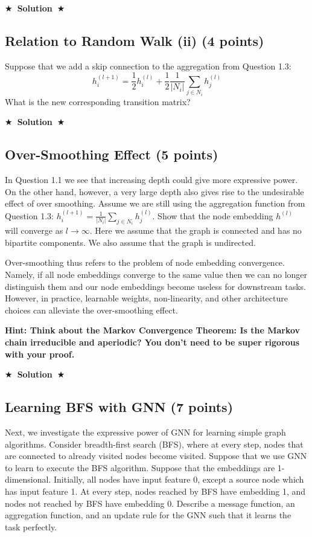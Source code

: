 \documentclass{article}
\numberwithin{figure}{section}
\newcommand{\Solution}[1]{{\medskip \color{red} \bf $\bigstar$~\sf \textbf{Solution}~$\bigstar$ \sf #1 } \bigskip}
\begin{document}
\Solution{}


\subsection{Relation to Random Walk (ii) (4 points)}

Suppose that we add a skip connection to the aggregation from Question 1.3:
$$h^{(l+1)}_i = \frac{1}{2}h^{(l)}_i + \frac{1}{2}\frac{1}{|N_i|} \sum_{j \in N_i} h^{(l)}_j$$
What is the new corresponding transition matrix?

\Solution{}


\subsection{Over-Smoothing Effect (5 points)}

In Question 1.1 we see that increasing depth could give more expressive power.
On the other hand, however, a very large depth also gives rise to the undesirable
effect of over smoothing. Assume we are still using the aggregation function
from Question 1.3: $h^{(l+1)}_i = \frac{1}{|N_i|} \sum_{j \in N_i} h^{(l)}_j$. Show that the node embedding $h^{(l)}$ will converge as $l \rightarrow \infty$. Here we assume that the graph is connected and has no bipartite components. We also assume that the graph is undirected.

Over-smoothing thus refers to the problem of node embedding convergence. Namely, if all node embeddings converge to the same value then we can no longer distinguish them and our node embeddings become useless for downstream tasks. However, in practice, learnable weights, non-linearity, and other architecture choices can alleviate the over-smoothing effect.

\textbf{Hint: Think about the Markov Convergence Theorem: Is the Markov chain irreducible and aperiodic? You don’t need to be super rigorous with your proof.}

\Solution{}


\subsection{Learning BFS with GNN (7 points)}

Next, we investigate the expressive power of GNN for learning simple graph algorithms. Consider breadth-first search (BFS), where at every step, nodes that are connected to already visited nodes become visited. Suppose that we use GNN to learn to execute the BFS algorithm. Suppose that the embeddings are 1-dimensional. Initially, all nodes have input feature 0, except a source node which has input feature 1. At every step, nodes reached by BFS have embedding 1, and nodes not reached by BFS have embedding 0. Describe a message function, an aggregation function, and an update rule for the GNN such that it learns the task perfectly.
\end{document}
